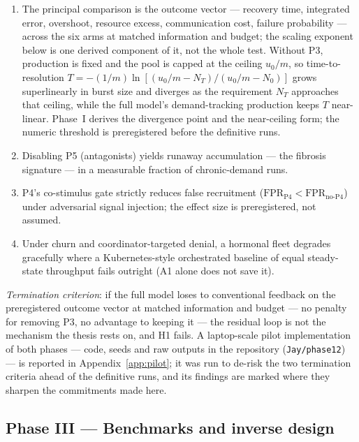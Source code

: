 \documentclass[twoside,twocolumn,usenatbib]{mnras}
\begin{document}
\begin{enumerate}
\item[(H1)] The principal comparison is the outcome vector --- recovery
time, integrated error, overshoot, resource excess, communication
cost, failure probability --- across the six arms at matched
information and budget; the scaling exponent below is one derived
component of it, not the whole test. Without P3, production is fixed
and the pool is capped at the ceiling $u_0/m$, so time-to-resolution
$T = -(1/m)\ln\!\left[(u_0/m - N_T)/(u_0/m - N_0)\right]$ grows
superlinearly in burst size and diverges as the requirement $N_T$
approaches that ceiling, while the full model's demand-tracking
production keeps $T$ near-linear. Phase~I derives the divergence point
and the near-ceiling form; the numeric threshold is preregistered
before the definitive runs.
\item[(H2)] Disabling P5 (antagonists) yields runaway accumulation ---
the fibrosis signature --- in a measurable fraction of chronic-demand
runs.
\item[(H2)] P4's co-stimulus gate strictly reduces false recruitment
($\mathrm{FPR}_{\mathrm{P4}} < \mathrm{FPR}_{\mathrm{no\text{-}P4}}$)
under adversarial signal injection; the effect size is preregistered,
not assumed.
\item[(H3)] Under churn and coordinator-targeted denial, a hormonal fleet
degrades gracefully where a Kubernetes-style orchestrated baseline of
equal steady-state throughput fails outright (A1 alone does not save
it).
\end{enumerate}

\emph{Termination criterion}: if the full model loses to conventional
feedback on the preregistered outcome vector at matched information
and budget --- no penalty for removing P3, no advantage to keeping it
--- the residual loop is not the mechanism the thesis rests on, and H1
fails. A laptop-scale pilot implementation of both phases --- code,
seeds and raw outputs in the repository (\texttt{Jay/phase12}) --- is
reported in Appendix~\ref{app:pilot}; it was run to de-risk the two
termination criteria ahead of the definitive runs, and its findings
are marked where they sharpen the commitments made here.

\subsection{Phase III --- Benchmarks and inverse design}
\end{document}

